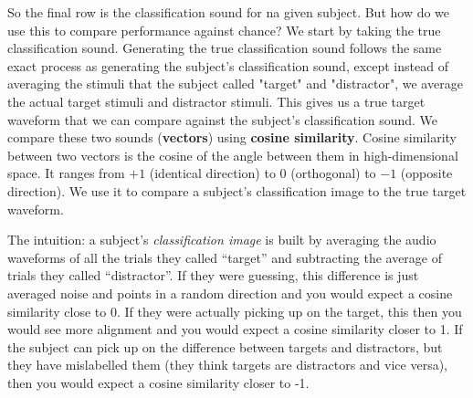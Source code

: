 \documentclass[11pt]{article}
\begin{document}
\begin{center}
\end{center}


So the final row is the classification sound for na given subject. But how do we use this to compare performance against chance?
We start by taking the true classification sound. Generating the true classification sound follows the same exact process as generating the subject's classification sound, except instead of averaging the stimuli that the subject called "target" and "distractor", we average the actual target stimuli and distractor stimuli. This gives us a true target waveform that we can compare against the subject's classification sound.
We compare these two sounds (\textbf{vectors}) using \textbf{cosine similarity}. Cosine similarity between two vectors is the cosine of the angle between them in high-dimensional space. It ranges from $+1$ (identical direction) to $0$ (orthogonal) to $-1$ (opposite direction). We use it to compare a subject's classification image to the true target waveform.

The intuition: a subject's \emph{classification image} is built by
averaging the audio waveforms of all the trials they called ``target''
and subtracting the average of trials they called ``distractor''. If
they were guessing, this difference is just averaged noise and points
in a random direction and you would expect a cosine similarity close to 0. If they were actually picking up on the target,
this then you would see more alignment and you would expect a cosine similarity closer to 1.
If the subject can pick up on the difference between targets and distractors, but they have mislabelled them (they think targets are distractors and vice versa), then you would expect a cosine similarity closer to -1.
\end{document}
